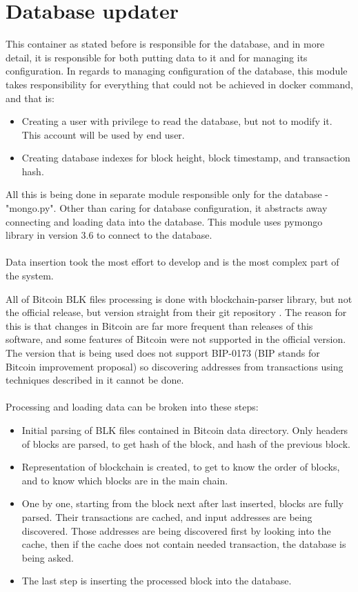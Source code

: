 \documentclass[12pt, en, eng, oneside, final]{mgr}
\begin{document}
\section{Database updater}
This container as stated before is responsible for the database, and in more detail, it is responsible for both putting data to it and for managing its configuration. In regards to managing configuration of the database, this module takes responsibility for everything that could not be achieved in docker command, and that is:

\begin{itemize}
\item
Creating a user with privilege to read the database, but not to modify it. This account will be used by end user.
\item
Creating database indexes for block height, block timestamp, and transaction hash.
\end{itemize}

All this is being done in separate module responsible only for the database - "mongo.py". Other than caring for database configuration, it abstracts away connecting and loading data into the database. This module uses pymongo\cite{pymongo} library in version 3.6 to connect to the database.
\\
\\  
Data insertion took the most effort to develop and is the most complex part of the system.

All of Bitcoin BLK files processing is done with blockchain-parser\cite{blockchain-parser} library, but not the official release, but version straight from their git repository \cite{blockchain-parser}. The reason for this is that changes in Bitcoin are far more frequent than releases of this software, and some features of Bitcoin were not supported in the official version. The version that is being used does not support BIP-0173 \cite{bip173} (BIP stands for Bitcoin improvement proposal) so discovering addresses from transactions using techniques described in it cannot be done. 
\\
\\
Processing and loading data can be broken into these steps:
\begin{itemize}
\item
Initial parsing of BLK files contained in Bitcoin data directory. Only headers of blocks are parsed, to get hash of the block, and hash of the previous block.
\item
Representation of blockchain is created, to get to know the order of blocks, and to know which blocks are in the main chain.
\item
One by one, starting from the block next after last inserted, blocks are fully parsed. Their transactions are cached, and input addresses are being discovered. Those addresses are being discovered first by looking into the cache, then if the cache does not contain needed transaction, the database is being asked.
\item
The last step is inserting the processed block into the database.
\end{itemize}
\end{document}
